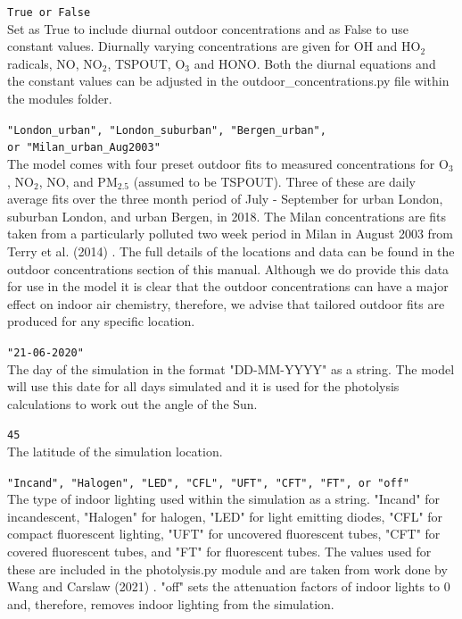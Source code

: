 \documentclass[a4paper]{refart}
\begin{document}
\texttt{True or False}\\
Set as True to include diurnal outdoor concentrations and as False to use constant values. Diurnally varying concentrations are given for OH and HO$_2$ radicals, NO, NO$_2$, TSPOUT, O$_3$ and HONO. Both the diurnal equations and the constant values can be adjusted in the outdoor\_concentrations.py  file within the modules folder.

\texttt{"London\_urban", "London\_suburban", "Bergen\_urban",\\ or "Milan\_urban\_Aug2003"}\\
The model comes with four preset outdoor fits to measured concentrations for O$_3$, NO$_2$, NO, and PM$_{2.5}$ (assumed to be TSPOUT). Three of these are daily average fits over the three month period of July - September for urban London, suburban London, and urban Bergen, in 2018. The Milan concentrations are fits taken from a particularly polluted two week period in Milan in August 2003 from Terry et al. (2014) \cite{Terry2014}. The full details of the locations and data can be found in the outdoor concentrations section of this manual.  Although we do provide this data for use in the model it is clear that the outdoor concentrations can have a major effect on indoor air chemistry, therefore, we advise that tailored outdoor fits are produced for any specific location.

\texttt{"21-06-2020"}\\
The day of the simulation in the format "DD-MM-YYYY" as a string. The model will use this date for all days simulated and it is used for the photolysis calculations to work out the angle of the Sun.

\texttt{45}\\
The latitude of the simulation location.

\texttt{"Incand", "Halogen", "LED", "CFL", "UFT", "CFT", "FT", or "off"}\\
The type of indoor lighting used within the simulation as a string. "Incand" for incandescent, "Halogen" for halogen, "LED" for light emitting diodes, "CFL" for compact fluorescent lighting, "UFT" for uncovered fluorescent tubes, "CFT" for covered fluorescent tubes, and "FT" for fluorescent tubes. The values used for these are included in the photolysis.py  module and are taken from work done by Wang and Carslaw (2021) \cite{Wang2021b}. "off" sets the attenuation factors of indoor lights to 0 and, therefore, removes indoor lighting from the simulation.
\end{document}

